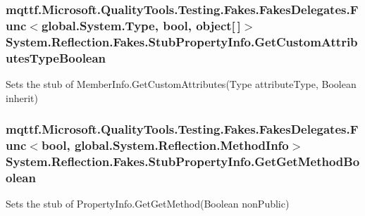 \hypertarget{class_system_1_1_reflection_1_1_fakes_1_1_stub_property_info_ad467c72feec76507fb493ac4587cad39}{
\subsubsection[{Get\-Custom\-Attributes\-Type\-Boolean}]{\setlength{\rightskip}{0pt plus 5cm}mqttf.\-Microsoft.\-Quality\-Tools.\-Testing.\-Fakes.\-Fakes\-Delegates.\-Func$<$global.\-System.\-Type, bool, object\mbox{[}$\,$\mbox{]}$>$ System.\-Reflection.\-Fakes.\-Stub\-Property\-Info.\-Get\-Custom\-Attributes\-Type\-Boolean}}\label{class_system_1_1_reflection_1_1_fakes_1_1_stub_property_info_ad467c72feec76507fb493ac4587cad39}


Sets the stub of Member\-Info.\-Get\-Custom\-Attributes(\-Type attribute\-Type, Boolean inherit)

\hypertarget{class_system_1_1_reflection_1_1_fakes_1_1_stub_property_info_a2568efd32b4173d8d2df061f9b6b7e7d}{
\subsubsection[{Get\-Get\-Method\-Boolean}]{\setlength{\rightskip}{0pt plus 5cm}mqttf.\-Microsoft.\-Quality\-Tools.\-Testing.\-Fakes.\-Fakes\-Delegates.\-Func$<$bool, global.\-System.\-Reflection.\-Method\-Info$>$ System.\-Reflection.\-Fakes.\-Stub\-Property\-Info.\-Get\-Get\-Method\-Boolean}}\label{class_system_1_1_reflection_1_1_fakes_1_1_stub_property_info_a2568efd32b4173d8d2df061f9b6b7e7d}


Sets the stub of Property\-Info.\-Get\-Get\-Method(\-Boolean non\-Public)

